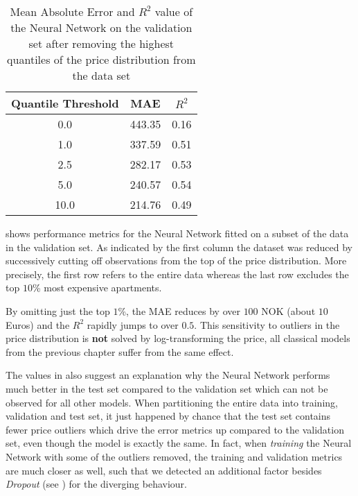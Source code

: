 \begin{table}[t]
  \centering
  \begin{tabular}{@{}ccc@{}}
    \toprule
    Quantile Threshold & MAE    & $R^2$ \\ \midrule
    0.0                & 443.35 & 0.16  \\
    1.0                & 337.59 & 0.51  \\
    2.5                & 282.17 & 0.53  \\
    5.0                & 240.57 & 0.54  \\
    10.0               & 214.76 & 0.49  \\ \bottomrule
  \end{tabular}
  \caption{Mean Absolute Error and $R^2$ value of the Neural Network on the validation set after removing the highest quantiles of the price distribution from the data set}
  \label{tab:mlp-outliers}
\end{table}

 shows performance metrics for the Neural Network fitted on a subset of the data in the validation set.
As indicated by the first column the dataset was reduced by successively cutting off observations from the top of the price distribution.
More precisely, the first row refers to the entire data whereas the last row excludes the top $10$\% most expensive apartments.

By omitting just the top $1$\%, the MAE reduces by over $100$ NOK (about $10$ Euros) and the $R^2$ rapidly jumps to over $0.5$.
This sensitivity to outliers in the price distribution is \textbf{not} solved by log-transforming the price, all classical models from the previous chapter suffer from the same effect.

The values in  also suggest an explanation why the Neural Network performs much better in the test set compared to the validation set which can not be observed for all other models.
When partitioning the entire data into training, validation and test set, it just happened by chance that the test set contains fewer price outliers which drive the error metrics up compared to the validation set, even though the model is exactly the same.
In fact, when \emph{training} the Neural Network with some of the outliers removed, the training and validation metrics are much closer as well, such that we detected an additional factor besides \emph{Dropout} (see ) for the diverging behaviour.

